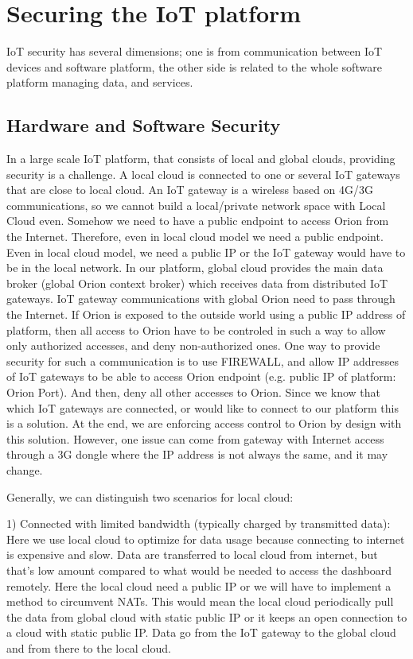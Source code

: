 \section{Securing the IoT platform}
IoT security has several dimensions; one is from communication between IoT devices and software platform, the other side is related to the whole software platform managing data, and services.

\subsection{Hardware and Software Security}
In a large scale IoT platform, that consists of local and global clouds, providing security is a challenge. A local cloud is connected to one or several IoT gateways that are close to local cloud. 
An IoT gateway is a wireless based on 4G/3G communications, so we cannot build a local/private network space with Local Cloud even. Somehow we need to have a public endpoint to access Orion from the Internet. Therefore, even in local cloud model we need a public endpoint. Even in local cloud model, we need a public IP or the IoT gateway would have to be in the local network.
In our platform, global cloud provides the main data broker (global Orion context broker) which receives data from distributed IoT gateways. IoT gateway communications with global Orion need to pass through the Internet. If Orion is exposed to the outside world using a public IP address of platform, then all access to Orion have to be controled in such a way to allow only authorized accesses, and deny non-authorized ones.
One way to provide security for such a communication is to use FIREWALL, and allow IP addresses of IoT gateways to be able to access Orion endpoint (e.g. public IP of platform: Orion Port). And then, deny all other accesses to Orion. Since we know that which IoT gateways are connected, or would like to connect to our platform this is a solution. At the end, we are enforcing access control to Orion by design with this solution. However, one issue can come from gateway with Internet access through a 3G dongle where the IP address is not always the same, and it may change. 

Generally, we can distinguish two scenarios for local cloud:

1) Connected with limited bandwidth (typically charged by transmitted data): Here we use local cloud to optimize for data usage because connecting to internet is expensive and slow. Data are transferred to local cloud from internet, but that's low amount compared to what would be needed to access the dashboard remotely. Here the local cloud need a public IP or we will have to implement a method to circumvent NATs. This would mean the local cloud periodically pull the data from global cloud with static public IP or it keeps an open connection to a cloud with static public IP. Data go from the IoT gateway to the global cloud and from there to the local cloud.

